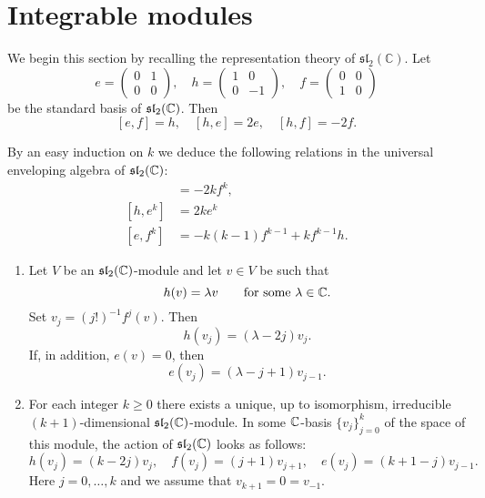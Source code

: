 \documentclass[12pt]{article}
\begin{document}
\section{Integrable modules}
We begin this section by recalling the representation theory of $\mathfrak{sl}_2(\mathbb{C})$. Let
\[
    e = \begin{pmatrix} 0 & 1 \\ 0 & 0 \end{pmatrix},
    \quad
    h = \begin{pmatrix} 1 & 0 \\ 0 & -1 \end{pmatrix},
    \quad
    f = \begin{pmatrix} 0 & 0 \\ 1 & 0 \end{pmatrix}
\]
be the standard basis of $\mathfrak{sl}_2(\mathbb{C})$. Then
\[
    [e,f] = h,
    \quad [h,e] = 2e,
    \quad [h,f] = -2f.
\]

By an easy induction on $k$ we deduce the following relations in the universal enveloping algebra of $\mathfrak{sl}_2(\mathbb{C})$:
\begin{align*}
    [h,f^k] & = -2k f^k,                       \\
    [h,e^k] & = 2k e^k                         \\
    [e,f^k] & = -k(k-1) f^{k-1} + k f^{k-1} h.
\end{align*}

\begin{lemma}\label{lem:sl2-modules}
    \leavevmode
    \begin{enumerate}[label=(\alph*)]
        \item Let $V$ be an $\mathfrak{sl}_2(\mathbb{C})$-module and let $v \in V$ be such that
              \[
                  h(v) = \lambda v \qquad \text{for some } \lambda \in \mathbb{C}.
              \]
              Set $v_j = (j!)^{-1} f^j(v)$. Then
              \begin{equation}
                  h(v_j) = (\lambda - 2j) v_j. \tag{3.2.3}
              \end{equation}
              If, in addition, $e(v) = 0$, then
              \begin{equation}
                  e(v_j) = (\lambda - j + 1)v_{j-1}. \tag{3.2.4}
              \end{equation}

        \item For each integer $k \geq 0$ there exists a unique, up to isomorphism, irreducible $(k+1)$-dimensional $\mathfrak{sl}_2(\mathbb{C})$-module. In some $\mathbb{C}$-basis $\{v_j\}_{j=0}^k$ of the space of this module, the action of $\mathfrak{sl}_2(\mathbb{C})$ looks as follows:
              \[
                  h(v_j) = (k-2j)v_j,
                  \quad f(v_j) = (j+1)v_{j+1},
                  \quad e(v_j) = (k+1-j)v_{j-1}.
              \]
              Here $j=0,\dots,k$ and we assume that $v_{k+1}=0=v_{-1}$.
    \end{enumerate}
\end{lemma}
\end{document}
